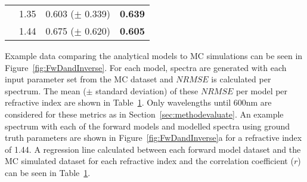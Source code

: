 \begin{table}[bhp]
\begin{tabular}{|c|c|c|c|}
        & 1.35 & 0.603 ($\pm$ 0.339) & \textbf{0.639} \\
        & 1.44 & 0.675 ($\pm$ 0.620) & \textbf{0.605} \\
        \hline
    \end{tabular}
    \label{tb:NRMSEsingle}
\end{table}

Example data comparing the analytical models to MC simulations can be seen in Figure~\ref{fig:FwDandInverse}.
For each model, spectra are generated with each
input
parameter set from the MC dataset and $NRMSE$ is calculated per spectrum. The mean ($\pm$ standard deviation) of these $NRMSE$ per model per refractive index are shown in Table~\ref{tb:NRMSEsingle}.
Only wavelengths until 600nm are considered for these metrics as in Section~\ref{sec:methodevaluate}. An example spectrum with each of the forward models and modelled spectra using ground truth parameters are shown in Figure~\ref{fig:FwDandInverse}a for a refractive index of 1.44. A regression line calculated between each forward model dataset and the MC simulated dataset for each refractive index and the correlation coefficient ($r$) can be seen in Table~\ref{tb:NRMSEsingle}.

